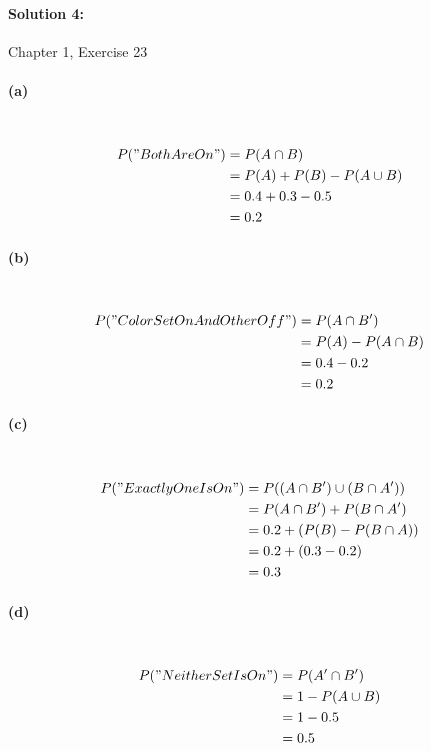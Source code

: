 \documentclass[a4paper]{article}
\begin{document}
\paragraph{Solution 4:}
Chapter 1, Exercise 23

\paragraph{(a)} ~\\
\begin{align*}
P("BothAreOn") &= P(A \cap B) \\
               &= P(A) + P(B) - P(A \cup B) \\
               &= 0.4 + 0.3 - 0.5 \\
               &= 0.2
\end{align*}

\paragraph{(b)} ~\\
\begin{align*}
P("ColorSetOnAndOtherOff") &= P(A \cap B') \\
                           &= P(A) - P(A \cap B) \\
                           &= 0.4 - 0.2 \\
                           &= 0.2
\end{align*}

\paragraph{(c)} ~\\
\begin{align*}
P("ExactlyOneIsOn") &= P((A \cap B') \cup (B \cap A'))  \\
                    &= P(A \cap B') + P(B \cap A') \\
                    &= 0.2 + (P(B) - P(B \cap A)) \\
                    &= 0.2 + (0.3 - 0.2) \\
                    &= 0.3
\end{align*}

\paragraph{(d)} ~\\
\begin{align*}
P("NeitherSetIsOn") &= P(A' \cap B') \\
                    &= 1 - P(A \cup B) \\
                    &= 1 - 0.5 \\
                    &= 0.5
\end{align*}
\end{document}
